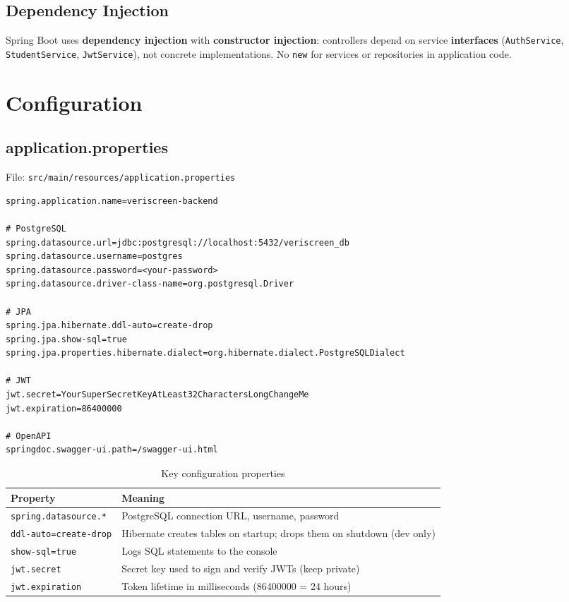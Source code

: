 \documentclass[11pt,a4paper]{article}
\begin{document}
\subsection{Dependency Injection}

Spring Boot uses \textbf{dependency injection} with \textbf{constructor injection}: controllers depend on service \textbf{interfaces} (\texttt{AuthService}, \texttt{StudentService}, \texttt{JwtService}), not concrete implementations. No \texttt{new} for services or repositories in application code.

\section{Configuration}

\subsection{application.properties}

File: \texttt{src/main/resources/application.properties}

\begin{lstlisting}[style=properties, caption={Application configuration (excerpt)}]
spring.application.name=veriscreen-backend

# PostgreSQL
spring.datasource.url=jdbc:postgresql://localhost:5432/veriscreen_db
spring.datasource.username=postgres
spring.datasource.password=<your-password>
spring.datasource.driver-class-name=org.postgresql.Driver

# JPA
spring.jpa.hibernate.ddl-auto=create-drop
spring.jpa.show-sql=true
spring.jpa.properties.hibernate.dialect=org.hibernate.dialect.PostgreSQLDialect

# JWT
jwt.secret=YourSuperSecretKeyAtLeast32CharactersLongChangeMe
jwt.expiration=86400000

# OpenAPI
springdoc.swagger-ui.path=/swagger-ui.html
\end{lstlisting}

\begin{table}[h]
\centering
\begin{tabular}{@{}lp{8.5cm}@{}}
\toprule
\textbf{Property} & \textbf{Meaning} \\
\midrule
\texttt{spring.datasource.*} & PostgreSQL connection URL, username, password \\
\texttt{ddl-auto=create-drop} & Hibernate creates tables on startup; drops them on shutdown (dev only) \\
\texttt{show-sql=true}        & Logs SQL statements to the console \\
\texttt{jwt.secret}            & Secret key used to sign and verify JWTs (keep private) \\
\texttt{jwt.expiration}        & Token lifetime in milliseconds (86400000 = 24 hours) \\
\bottomrule
\end{tabular}
\caption{Key configuration properties}
\end{table}
\end{document}
